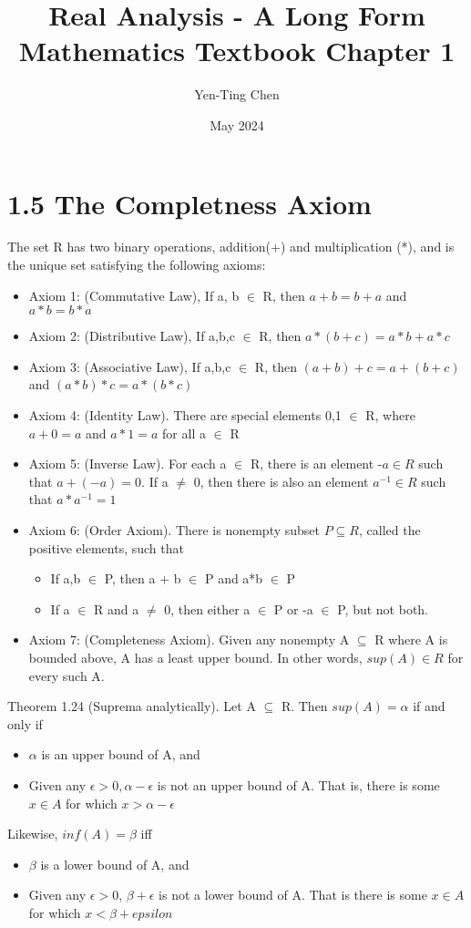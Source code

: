 \documentclass[12pt]{article}
\title{Real Analysis - A Long Form Mathematics Textbook Chapter 1}
\author{Yen-Ting Chen}
\date{May 2024}
\begin{document}
	\maketitle
	\section*{1.5 The Completness Axiom}
		The set R has two binary operations, addition(+) and multiplication (*), and is the unique set satisfying the following axioms:
		\begin{itemize}
			\item Axiom 1: (Commutative Law), If a, b $\in$ R, then $a+b = b+a$ and $a*b = b*a$
			\item Axiom 2: (Distributive Law), If a,b,c $\in$ R, then $a*(b+c) = a*b + a*c$
			\item Axiom 3: (Associative Law), If a,b,c $\in$ R, then $(a+b)+c = a+(b+c)$ and $(a*b)*c = a*(b*c)$
			\item Axiom 4: (Identity Law). There are special elements 0,1 $\in$ R, where $a+0 = a$ and $a*1=a$ for all a $\in$ R
			\item Axiom 5: (Inverse Law). For each a $\in$ R, there is an element -$a \in R$ such that $a + (-a) = 0$. If a $\ne$ 0, then there is also an element $a^{-1} \in R$ such that $a*a^{-1} = 1$
			\item Axiom 6: (Order Axiom). There is nonempty subset $P \subseteq R$, called the positive elements, such that
				\begin{itemize}
					\item If a,b $\in$ P, then a + b $\in$ P and a*b $\in$ P
					\item If a $\in$ R and a $\ne$ 0, then either a $\in$ P or -a $\in$ P, but not both.
				\end{itemize}
			\item Axiom 7: (Completeness Axiom). Given any nonempty A $\subseteq$ R where A is bounded above, A has a least upper bound. In other words, $sup(A) \in R$ for every such A.
		\end{itemize}
		
		Theorem 1.24 (Suprema analytically). Let A $\subseteq$ R. Then $sup(A) = \alpha$ if and only if
		\begin{itemize}
			\item $\alpha$ is an upper bound of A, and
			\item Given any $\epsilon > 0, \alpha - \epsilon$ is not an upper bound of A. That is, there is some $x \in A$ for which $x > \alpha - \epsilon$
		\end{itemize}
		Likewise, $inf(A) = \beta$ iff
		\begin{itemize}
			\item $\beta$ is a lower bound of A, and
			\item Given any $\epsilon > 0$, $\beta + \epsilon$ is not a lower bound of A. That is there is some $x \in A$ for which $x < \beta + epsilon$
		\end{itemize}
\end{document}
